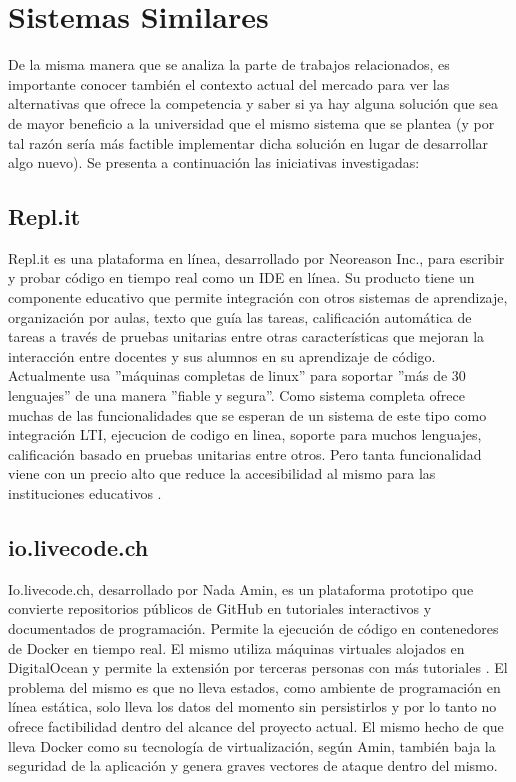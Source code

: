 \section{Sistemas Similares}
De la misma manera que se analiza la parte de trabajos relacionados, es importante conocer también el contexto actual del mercado para ver las alternativas que ofrece la competencia y saber si ya hay alguna solución que sea de mayor beneficio a la universidad que el mismo sistema que se plantea (y por tal razón sería más factible implementar dicha solución en lugar de desarrollar algo nuevo). Se presenta a continuación las iniciativas investigadas:

  
\subsection{Repl.it}
Repl.it es una plataforma en línea, desarrollado por Neoreason Inc., para escribir y probar código en tiempo real como un IDE en línea. Su producto tiene un componente educativo que permite integración con otros sistemas de aprendizaje, organización por aulas, texto que guía las tareas, calificación automática de tareas a través de pruebas unitarias entre otras características que mejoran la interacción entre docentes y sus alumnos en su aprendizaje de código. Actualmente usa ''máquinas completas de linux'' para soportar ''más de 30 lenguajes'' de una manera ''fiable y segura''. Como sistema completa ofrece muchas de las funcionalidades que se esperan de un sistema de este tipo como integración LTI,  ejecucion de codigo en linea, soporte para muchos lenguajes, calificación basado en pruebas unitarias entre otros. Pero tanta funcionalidad viene con un precio alto que reduce la accesibilidad al mismo para las instituciones educativos \citep{Repl.it-Home}.
 

\subsection{io.livecode.ch}
Io.livecode.ch, desarrollado por Nada Amin, es un plataforma prototipo que convierte repositorios públicos de GitHub en tutoriales interactivos y documentados de programación. Permite la ejecución de código en contenedores de Docker en tiempo real. El mismo utiliza máquinas virtuales alojados en DigitalOcean y permite la extensión por terceras personas con más tutoriales  \citep{io.livecode.ch}. El problema del mismo es que no lleva estados, como ambiente de programación en línea estática, solo lleva los datos del momento sin persistirlos y por lo tanto no ofrece factibilidad dentro del alcance del proyecto actual. El mismo hecho de que lleva Docker como su tecnología de virtualización, según Amin, también baja la seguridad de la aplicación y genera graves vectores de ataque dentro del mismo.

